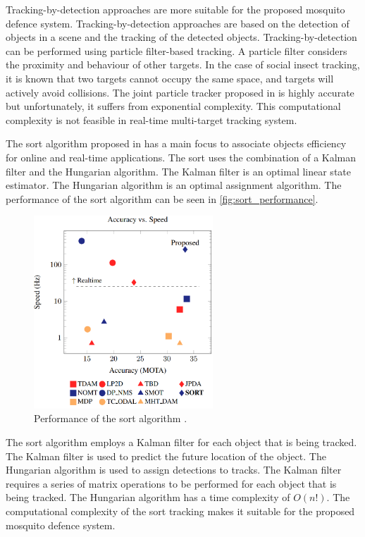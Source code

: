 Tracking-by-detection approaches are more suitable for the proposed mosquito defence system. Tracking-by-detection approaches are based on the detection of objects in a scene and the tracking of the detected objects. Tracking-by-detection can be performed using particle filter-based tracking. A particle filter considers the proximity and behaviour of other targets. In the case of social insect tracking, it is known that two targets cannot occupy the same space, and targets will actively avoid collisions. The joint particle tracker proposed in \cite{Khan2003} is highly accurate but unfortunately, it suffers from exponential complexity. This computational complexity is not feasible in real-time multi-target tracking system.

The \gls{sort} algorithm proposed in \cite{SORT-Bewley2017} has a main focus to associate objects efficiency for online and real-time applications. The \gls{sort} uses the combination of a Kalman filter and the Hungarian algorithm. The Kalman filter is an optimal linear state estimator. The Hungarian algorithm is an optimal assignment algorithm. The performance of the \gls{sort} algorithm can be seen in \autoref{fig:sort_performance}.
\begin{figure}[!htb]
      \centering
      \includegraphics[width=0.6\textwidth]{figures/sort_performance.png}
      \caption{Performance of the \gls{sort} algorithm \cite{SORT-Bewley2017}.}
      \label{fig:sort_performance}
\end{figure}
The \gls{sort} algorithm employs a Kalman filter for each object that is being tracked. The Kalman filter is used to predict the future location of the object. The Hungarian algorithm is used to assign detections to tracks. The Kalman filter requires a series of matrix operations to be performed for each object that is being tracked. The Hungarian algorithm has a time complexity of $O\left(n!\right)$. The computational complexity of the \gls{sort} tracking makes it suitable for the proposed mosquito defence system.

